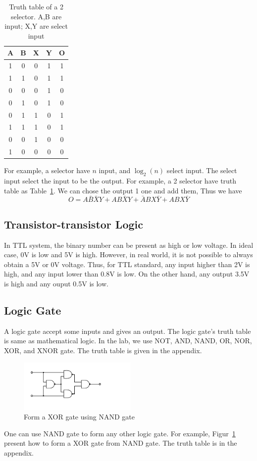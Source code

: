 \documentclass[aps,prl,reprint]{revtex4-1}
\begin{document}
        \begin{table}[h]
        \begin{tabular}{ccccc} 
        A&B&X&Y&O \\ \hline
        1&0&0&1&1 \\ 
        1&1&0&1&1 \\ 
        0&0&0&1&0 \\ 
        0&1&0&1&0 \\ 
        0&1&1&0&1 \\ 
        1&1&1&0&1 \\ 
        0&0&1&0&0 \\ 
        1&0&0&0&0 \\ 
        \end{tabular}
        \caption{Truth table of a 2 selector. A,B are input; X,Y are select input}
        \label{table:selector}
        \end{table} 
        For example, a selector have $n$ input, and $\log_2(n)$ select input. The select input select the input to be the output. For example, a 2 selector have truth table as Table~\ref{table:selector}. We can chose the output 1 one and add them, Thus we have
        \[
        O = A \bar B \bar X Y + AB\bar X Y + \bar A B X \bar Y + ABX \bar Y
        \]
    \subsection{Transistor-transistor Logic}
        In TTL system, the binary number can be present as high or low voltage. In ideal case, 0V is low and 5V is high. However, in real world, it is not possible to always obtain a 5V or 0V voltage. Thus, for TTL standard, any input higher than 2V is high, and any input lower than 0.8V is low. On the other hand, any output 3.5V is high and any ouput 0.5V is low.
    \subsection{Logic Gate}
        A logic gate accept some inputs and gives an output. The logic gate's truth table is same as mathematical logic. In the lab, we use NOT, AND, NAND, OR, NOR, XOR, and XNOR gate. The truth table is given in the appendix.

        \begin{figure}[h]
            \centering
            \includegraphics[height=1in]{image/NAND-XOR.pdf}
            \caption{Form a XOR gate using NAND gate}
            \label{fig:nandToXor}
        \end{figure}
        One can use NAND gate to form any other logic gate. For example, Figur~\ref{fig:nandToXor} present how to form a XOR gate from NAND gate. The truth table is in the appendix.
\end{document}
